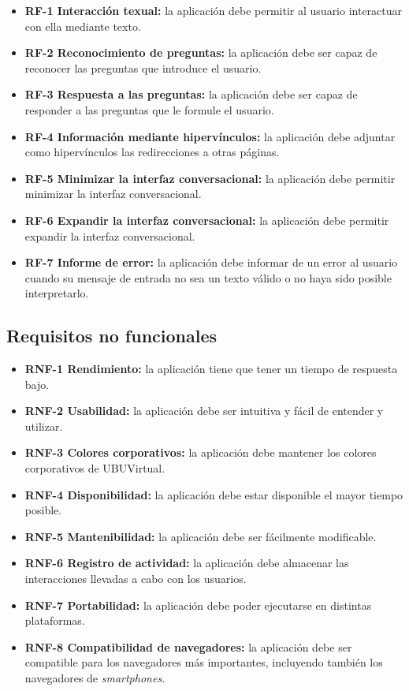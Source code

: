 \begin{itemize}
	\tightlist
	\item
	\textbf{RF-1 Interacción texual:} la aplicación debe permitir al usuario interactuar con ella mediante texto.
	\item
	\textbf{RF-2 Reconocimiento de preguntas:} la aplicación debe ser capaz de reconocer las preguntas que introduce el usuario.
	\item
	\textbf{RF-3 Respuesta a las preguntas:} la aplicación debe ser capaz de responder a las preguntas que le formule el usuario.
	\item
	\textbf{RF-4 Información mediante hipervínculos:} la aplicación debe adjuntar como hipervínculos las redirecciones a otras páginas.
	\item
	\textbf{RF-5 Minimizar la interfaz conversacional:} la aplicación debe permitir minimizar la interfaz conversacional.
	\item
	\textbf{RF-6 Expandir la interfaz conversacional:} la aplicación debe permitir expandir la interfaz conversacional.
	\item
	\textbf{RF-7 Informe de error:} la aplicación debe informar de un error al usuario cuando su mensaje de entrada no sea un texto válido o no haya sido posible interpretarlo. 
\end{itemize}


\subsection{Requisitos no funcionales}\label{requisitosNoFuncionales}

\begin{itemize}
	\tightlist
	\item
	\textbf{RNF-1 Rendimiento:} la aplicación tiene que tener un tiempo de respuesta bajo.  
	\item
	\textbf{RNF-2 Usabilidad:} la aplicación debe ser intuitiva y fácil de entender y utilizar.  
	\item
	\textbf{RNF-3 Colores corporativos:} la aplicación debe mantener los colores corporativos de UBUVirtual.  
	\item
	\textbf{RNF-4 Disponibilidad:} la aplicación debe estar disponible el mayor tiempo posible.
	\item
	\textbf{RNF-5 Mantenibilidad:} la aplicación debe ser fácilmente modificable.
	\item
	\textbf{RNF-6 Registro de actividad:} la aplicación debe almacenar las interacciones llevadas a cabo con los usuarios.
	\item
	\textbf{RNF-7 Portabilidad:} la aplicación debe poder ejecutarse en distintas plataformas.
	\item
	\textbf{RNF-8 Compatibilidad de navegadores:} la aplicación debe ser compatible para los navegadores más importantes, incluyendo también los navegadores de \textit{smartphones}.
\end{itemize}

